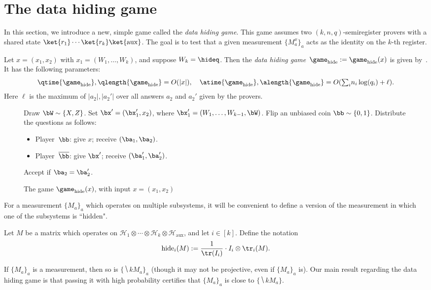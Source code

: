 \section{The data hiding game}\label{sec:data-hiding-layer}

In this section, we introduce a new, simple game called the \emph{data hiding game}.
This game assumes two $(k,n,q)$-semiregister provers with a shared state $\ket{r_1} \cdots \ket{r_k} \ket{\mathrm{aux}}$.
The goal is to test that a given measurement $\{M_a^x\}_a$ acts as the identity on the $k$-th register.

\begin{definition}\label{def:data-hide-def}
Let $x = (x_1, x_2)$ with $x_1 = (W_1, \ldots, W_k)$, and suppose $W_k = \hideq$.
Then the \emph{data hiding game}~$\game_{\mathrm{hide}} := \game_{\mathrm{hide}}(x)$ is given by~.
It has the following parameters:
\begin{equation*}
\qtime{\game_{\mathrm{hide}}},
\qlength{\game_{\mathrm{hide}}} = O(|x|),
\quad
\atime{\game_{\mathrm{hide}}},
\alength{\game_{\mathrm{hide}}} = O(\textstyle{\sum_i} n_i \log(q_i) + \ell).
\end{equation*}
Here $\ell$ is the maximum of $|a_2|, |a_2'|$ over all answers $a_2$ and $a_2'$ given by the provers.
\end{definition}

{
\begin{figure}[htbp]
Draw $\bW \sim \{X, Z\}$. Set $\bx' = (\bx_1', x_2)$, where $\bx_1' = (W_1, \ldots, W_{k-1}, \bW)$.
Flip an unbiased coin $\bb \sim \{0, 1\}$. Distribute the questions as follows:
\begin{itemize}
\item[$\circ$] Player~$\bb$: give $x$; receive $(\ba_1, \ba_2)$.
\item[$\circ$] Player~$\overline{\bb}$: give $\bx'$; receive $(\ba_1', \ba_2')$.
\end{itemize}
Accept if $\ba_2 = \ba_2'$.
\caption{The game $\game_{\mathrm{hide}}(x)$, with input $x = (x_1, x_2)$ \label{fig:hide-one}}
\end{figure}
}

For a measurement $\{M_a\}_a$ which operates on multiple subsystems,
it will be convenient to define a version of the measurement in which one of the subsystems is ``hidden".

\begin{notation}
Let $M$ be a matrix which operates on $\mathcal{H}_1 \otimes \cdots \otimes \mathcal{H}_k \otimes \mathcal{H}_{\mathrm{aux}}$, and let $i \in [k]$.
Define the notation
\begin{equation*}
\mathrm{hide}_i(M)
:= \frac{1}{\tr(I_i)} \cdot I_i \otimes \tr_i(M).
\end{equation*}
\label{not:hide}
\end{notation}
If $\{M_a\}_a$ is a measurement, then so is $\{\hide{k}{M_a}\}_a$ (though it may not be projective, even if $\{M_a\}_a$ is).
Our main result regarding the data hiding game is that passing it with high probability certifies that $\{M_a\}_a$ is close to $\{\hide{k}{M_a}\}$.

